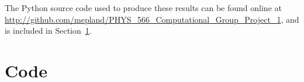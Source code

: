 \documentclass[notitlepage,aps,prd,nofootinbib]{revtex4-1}
\begin{document}
The Python source code used to produce these results can be found online at \url{http://github.com/mepland/PHYS_566_Computational_Group_Project_1}, and is included in Section~\ref{sec:code}.
\clearpage



\clearpage
\section{Code}
\label{sec:code}





\clearpage

\end{document}
